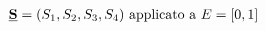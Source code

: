 \documentclass[preview]{standalone}
\begin{document}
\begin{align*}
& \textbf{\underline{S}} = (S_1,S_2,S_3,S_4) \ \text{applicato a} \ E = [0,1] \\
\end{align*}
\end{document}
